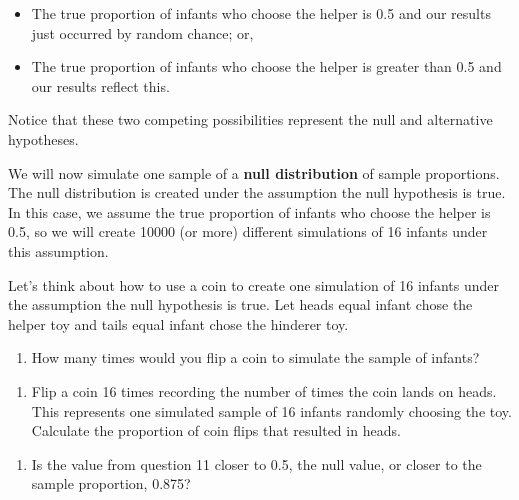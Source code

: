 \documentclass[
]{report}
\providecommand{\tightlist}{%
  \setlength{\itemsep}{0pt}\setlength{\parskip}{0pt}}
\begin{document}
\begin{itemize}
\item
  The true proportion of infants who choose the helper is 0.5 and our results just occurred by random chance; or,
\item
  The true proportion of infants who choose the helper is greater than 0.5 and our results reflect this.
\end{itemize}

Notice that these two competing possibilities represent the null and alternative hypotheses.

We will now simulate one sample of a \textbf{null distribution} of sample proportions. The null distribution is created under the assumption the null hypothesis is true. In this case, we assume the true proportion of infants who choose the helper is 0.5, so we will create 10000 (or more) different simulations of 16 infants under this assumption.

Let's think about how to use a coin to create one simulation of 16 infants under the assumption the null hypothesis is true. Let heads equal infant chose the helper toy and tails equal infant chose the hinderer toy.

\begin{enumerate}
\def\labelenumi{\arabic{enumi}.}
\setcounter{enumi}{9}
\tightlist
\item
  How many times would you flip a coin to simulate the sample of infants?
\end{enumerate}

\vspace{0.2in}

\begin{enumerate}
\def\labelenumi{\arabic{enumi}.}
\setcounter{enumi}{10}
\tightlist
\item
  Flip a coin 16 times recording the number of times the coin lands on heads. This represents one simulated sample of 16 infants randomly choosing the toy. Calculate the proportion of coin flips that resulted in heads.
\end{enumerate}

\vspace{0.2in}

\begin{enumerate}
\def\labelenumi{\arabic{enumi}.}
\setcounter{enumi}{11}
\tightlist
\item
  Is the value from question 11 closer to 0.5, the null value, or closer to the sample proportion, 0.875?
\end{enumerate}
\end{document}
